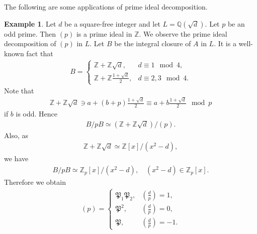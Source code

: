\documentclass[12pt]{article}
\theoremstyle{plain}
\theoremstyle{remark}
\theoremstyle{definition}
\newtheorem{example}[theorem]{Example}
\newcommand{\Z}{\mathbb{Z}}
\newcommand{\Q}{\mathbb{Q}}
\begin{document}
The following are some applications of prime ideal decomposition.

\begin{example}
    Let $d$ be a square-free integer and let $L=\Q(\sqrt{d})$. Let $p$ be an odd prime. Then $(p)$ is a prime ideal in $\Z$. We observe the prime ideal decomposition of $(p)$ in $L$. Let $B$ be the integral closure of $A$ in $L$. It is a well-known fact that
    \begin{align*}
        B=\begin{cases}
            \Z+\Z\sqrt{d},& d\equiv 1\mod 4,\\
            \Z+\Z\frac{1+\sqrt{d}}{2},& d\equiv 2,3\mod 4.
        \end{cases}
    \end{align*}
    Note that
    \begin{align*}
        \Z+\Z\sqrt{d} \ni a+(b+p)\frac{1+\sqrt{d}}{2}\equiv a+b\frac{1+\sqrt{d}}{2}\mod p
    \end{align*}
    if $b$ is odd. Hence
    \begin{align*}
        B/pB\simeq (\Z+\Z\sqrt{d})/(p).
    \end{align*}
    Also, as
    \begin{align*}
        \Z+\Z\sqrt{d}\simeq \Z[x]/(x^2-d),
    \end{align*}
    we have
    \begin{align*}
        B/pB\simeq \Z_p[x]/(x^2-d),\quad (x^2-d)\in \Z_p[x].
    \end{align*}
    Therefore we obtain
    \begin{align*}
        (p)=\begin{cases}
            \mathfrak{P}_1\mathfrak{P}_2,& (\frac{d}{p})=1, \\
            \mathfrak{P}^2,& (\frac{d}{p})=0, \\
            \mathfrak{P},& (\frac{d}{p})=-1.
        \end{cases}
    \end{align*}
\end{example}
\end{document}
